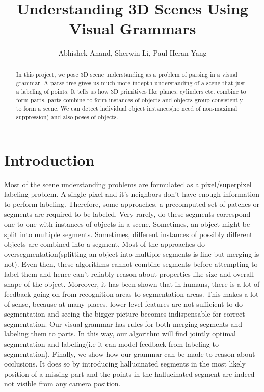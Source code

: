 \documentclass[11pt]{article} %
\title{Understanding 3D Scenes Using Visual Grammars}
\author{Abhishek Anand, Sherwin Li, Paul Heran Yang }
\begin{document}
\maketitle

\begin{abstract}
In this project, we pose 3D scene understanding as a problem of parsing in a visual grammar. A parse tree gives us much more indepth understanding of a scene that just a labeling of points. It tells us how 3D primitives like planes, cylinders etc. combine to form parts, parts combine to form instances of objects and objects group consistently to form a scene. We can detect individual object instances(no need of non-maximal suppression) and also poses of objects.
\end{abstract}

\section{Introduction}
Most of the scene understanding problems are formulated as a pixel/superpixel labeling problem. A single pixel and it's neighbors don't have enough information to perform labeling. Therefore, some approaches, a precomputed set of patches or segments are required to be labeled. Very rarely, do these segments correspond one-to-one with instances of objects in a scene. Sometimes, an object might be split into multiple segments. Sometimes, different instances of possibly different objects are combined into a segment. Most of the approaches do oversegmentation(splitting an object into multiple segments is fine but merging is not). Even then, these algorithms cannot combine segments before attempting to label them and hence can't reliably reason about properties like size and overall shape of the object. 
Moreover, it has been shown that in humans, there is a lot of feedback going on from recognition areas to segmentation areas. This makes a lot of sense, because at many places, lower level features are not sufficient to do segmentation and seeing the bigger picture becomes indispensable for correct segmentation. Our visual grammar has rules for both merging segments and labeling them to parts. In this way, our algorithm will find jointly optimal segmentation and labeling(i.e it can model feedback from labeling to segmentation).
Finally, we show how our grammar can be made to reason about occlusions. It does so by introducing hallucinated segments in the most likely position of a missing part and the points in the hallucinated segment are indeed not visible from any camera position.
\end{document}
